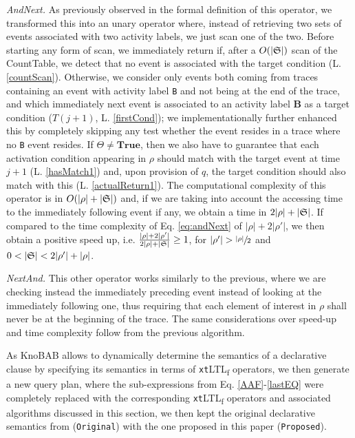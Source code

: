 \documentclass[sigconf]{acmart}
\begin{document}
\textit{AndNext.} As previously observed in the formal definition of this operator, we transformed this into an unary operator where, instead of retrieving two sets of events associated with two activity labels, we just scan one of the two. Before starting any form of scan, we immediately return if, after a $O(|\mathfrak{S}|)$ scan of the CountTable, we detect that no event is associated with the target condition (L. \ref{countScan}). Otherwise, we consider only events both coming from traces containing an event with  activity label \texttt{B} and not being at the end of the trace, and which immediately next event is associated to an activity label \textbf{B} as a target condition ($T(j+1)$, L. \ref{firstCond}); we implementationally further enhanced this by completely skipping any test whether the event resides in a trace where no \texttt{B} event resides. If $\Theta\neq\textbf{True}$, then we also have to guarantee that each activation condition appearing in $\rho$ should match with the target event at time $j+1$ (L. \ref{hasMatch1}) and, upon provision of $q$, the target condition should also match with this (L. \ref{actualReturn1}). The computational complexity of this operator is in $O(|\rho|+|\mathfrak{S}|)$ and, if we are taking into account the accessing time to the immediately following event if any, we obtain a time in $2|\rho|+|\mathfrak{S}|$. If compared to the time complexity of Eq. \ref{eq:andNext} of $|\rho|+2|\rho'|$, we then obtain a positive speed up, i.e. $\frac{|\rho|+2|\rho'|}{2|\rho|+|\mathfrak{S}|}\geq 1$, for $|\rho'|>\sfrac{|\rho|}{2}$ and $0<|\LOG|<2|\rho'|+|\rho|$.  \medskip

\textit{NextAnd.} This other operator works similarly to the previous, where we are checking instead the immediately preceding event instead of looking at the immediately following one, thus requiring that each element of interest in $\rho$ shall never be at the beginning of the trace. The same considerations over speed-up and time complexity follow from the previous algorithm. %
\medskip

As KnoBAB allows to dynamically determine the semantics of a declarative clause by specifying its semantics in terms of \texttt{xt}LTL\textsubscript{f} operators, we then generate a new query plan, where the sub-expressions from Eq. \ref{AAF}-\ref{lastEQ} were completely replaced with the corresponding \texttt{xt}LTL\textsubscript{f} operators and associated algorithms discussed in this section, we then kept the original declarative semantics from \cite{info14030173} (\texttt{Original}) with the one proposed in this paper (\texttt{Proposed}).
\end{document}
